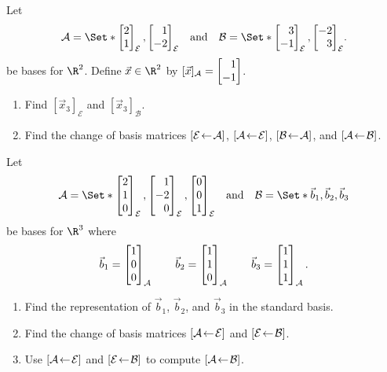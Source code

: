 \begin{exercises}
	\begin{problist}
		\prob 
		Let
		\[
			\mathcal A=\Set*{\mat{2\\1}_{\mathcal E},
			\mat{1\\-2}_{\mathcal E}}\quad\text{and}\quad
			\mathcal B=\Set*{\mat{3\\-1}_{\mathcal E},
			\mat{-2\\3}_{\mathcal E}}.
		\]
		be bases for $\R^2$. Define $\vec x\in \R^2$ by $[\vec x]_{\mathcal A}=\mat{1\\-1}$.
		\begin{enumerate}
			\item	Find $[\vec x_3]_{\mathcal E}$ and
				 $[\vec x_3]_{\mathcal B}$.

			\item Find the change of basis matrices 
				$\BasisChange{\mathcal A}{\mathcal E}$,
				$\BasisChange{\mathcal E}{\mathcal A}$,
				$\BasisChange{\mathcal A}{\mathcal B}$, and
				$\BasisChange{\mathcal B}{\mathcal A}$.
		\end{enumerate}

		\prob 
		Let
		\[
			\mathcal A=\Set*{
				\mat{2\\1\\0}_{\mathcal E},
				\mat{1\\-2\\0}_{\mathcal E},
				\mat{0\\0\\1}_{\mathcal E}
			}\quad\text{and}\quad
			\mathcal B=\Set*{\vec b_1,\vec b_2,\vec b_3
			}
		\]
		be bases for $\R^3$ where
		\[
			\vec b_1=\mat{1\\0\\0}_{\mathcal A}
			\qquad
			\vec b_2=\mat{1\\1\\0}_{\mathcal A}
			\qquad
			\vec b_3=\mat{1\\1\\1}_{\mathcal A}.
		\]
		
		\begin{enumerate}
			\item Find the representation of $\vec b_1$, $\vec b_2$, and $\vec b_3$
				in the standard basis.
			\item Find the change of basis matrices $\BasisChange{\mathcal E}{\mathcal A}$
				and $\BasisChange{\mathcal B}{\mathcal E}$.
			\item Use $\BasisChange{\mathcal E}{\mathcal A}$
				and $\BasisChange{\mathcal B}{\mathcal E}$ to compute
				$\BasisChange{\mathcal B}{\mathcal A}$.
		\end{enumerate}


\end{problist}
\end{exercises}

